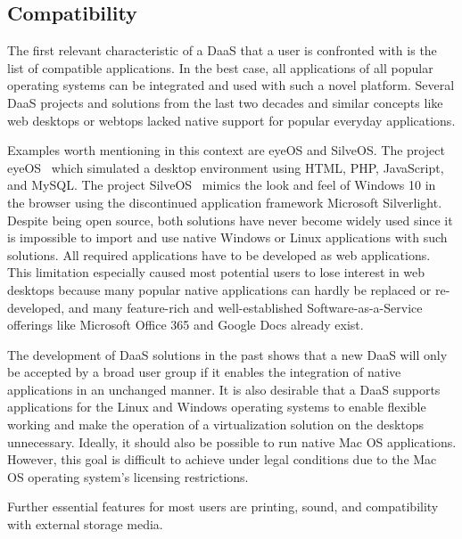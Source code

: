 \documentclass[runningheads]{llncs}
\begin{document}
\subsection{Compatibility}
% 

The first relevant characteristic of a DaaS that a user is confronted with is the list of compatible applications. In the best case, all applications of all popular operating systems can be integrated and used with such a novel platform. Several DaaS projects and solutions from the last two decades and similar concepts like web desktops or webtops lacked native support for popular everyday applications. 

Examples worth mentioning in this context are eyeOS and SilveOS. The project eyeOS~\cite{liu2012research,vidyabanu2011implementation} which simulated a desktop environment using HTML, PHP, JavaScript, and MySQL. The project SilveOS~\cite{garmpis2016design} mimics the look and feel of Windows 10 in the browser using the discontinued application framework Microsoft Silverlight. Despite being open source, both solutions have never become widely used since it is impossible to import and use native Windows or Linux applications with such solutions. All required applications have to be developed as web applications. This limitation especially caused most potential users to lose interest in web desktops because many popular native applications can hardly be replaced or re-developed, and many feature-rich and well-established Software-as-a-Service offerings like Microsoft Office 365 and Google Docs already exist.

The development of DaaS solutions in the past shows that a new DaaS will only be accepted by a broad user group if it enables the integration of native applications in an unchanged manner. It is also desirable that a DaaS supports applications for the Linux and Windows operating systems to enable flexible working and make the operation of a virtualization solution on the desktops unnecessary. Ideally, it should also be possible to run native Mac OS applications. However, this goal is difficult to achieve under legal conditions due to the Mac OS operating system's licensing restrictions.

Further essential features for most users are printing, sound, and compatibility with external storage media.

\end{document}

